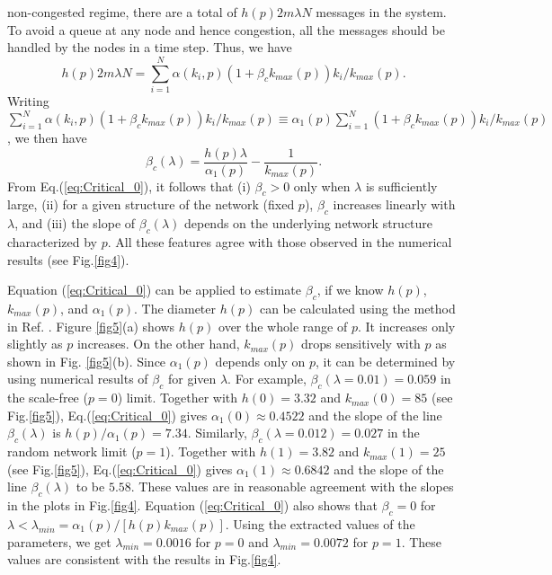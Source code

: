 \documentclass[aps,prl,twocolumn,superscriptaddress,showpacs]{revtex4}
\begin{document}
non-congested regime, there are a total of $h(p)2m\lambda N$
messages in the system. To avoid a queue at any node and hence
congestion, all the messages should be handled by the nodes in a
time step.  Thus, we have
\begin{equation} \label{eq:Little}
h(p)2m\lambda
N=\sum_{i=1}^N\alpha(k_i,p)(1+\beta_ck_{max}(p))k_i/k_{max}(p).
\end{equation}
Writing
$\sum_{i=1}^N\alpha(k_i,p)(1+\beta_ck_{max}(p))k_i/k_{max}(p)\equiv
\alpha_1(p)\sum_{i=1}^N(1+\beta_ck_{max}(p))k_i/k_{max}(p)$, we
then have
\begin{equation} \label{eq:Critical_0}
\beta_c(\lambda)
=\frac{h(p)\lambda}{\alpha_1(p)}-\frac{1}{k_{max}(p)}.
\end{equation}
From Eq.(\ref{eq:Critical_0}), it follows that (i) $\beta_{c} > 0$
only when $\lambda$ is sufficiently large, (ii) for a given
structure of the network (fixed $p$), $\beta_{c}$ increases
linearly with $\lambda$, and (iii) the slope of
$\beta_{c}(\lambda)$ depends on the underlying network structure
characterized by $p$.  All these features agree with those
observed in the numerical results (see Fig.\ref{fig4}).

Equation (\ref{eq:Critical_0}) can be applied to estimate
$\beta_{c}$, if we know $h(p)$, $k_{max}(p)$, and $\alpha_1(p)$.
The diameter $h(p)$ can be calculated using the method in Ref.
\cite{LL:2002}. Figure \ref{fig5}(a) shows $h(p)$ over the whole
range of $p$.  It increases only slightly as $p$ increases.  On
the other hand, $k_{max}(p)$ drops sensitively with $p$ as shown
in Fig. \ref{fig5}(b).  Since $\alpha_1(p)$ depends only on $p$,
it can be determined by using numerical results of $\beta_{c}$ for
given $\lambda$.  For example, $\beta_{c}(\lambda=0.01) = 0.059$
in the scale-free ($p=0$) limit.  Together with $h(0)=3.32$ and
$k_{max}(0)=85$ (see Fig.\ref{fig5}), Eq.(\ref{eq:Critical_0})
gives $\alpha_1(0)\approx 0.4522$ and the slope of the line
$\beta_{c}(\lambda)$ is $h(p)/\alpha_1(p) = 7.34$.  Similarly,
$\beta_{c}(\lambda = 0.012) = 0.027$ in the random network limit
($p=1$).  Together with $h(1)=3.82$ and $k_{max}(1)=25$ (see
Fig.\ref{fig5}), Eq.(\ref{eq:Critical_0}) gives
$\alpha_1(1)\approx 0.6842$ and the slope of the line
$\beta_{c}(\lambda)$ to be $5.58$.  These values are in reasonable
agreement with the slopes in the plots in Fig.\ref{fig4}. Equation
(\ref{eq:Critical_0}) also shows that $\beta_{c} = 0$ for $\lambda
< \lambda_{min} = \alpha_1(p)/[h(p)k_{max}(p)]$.  Using the
extracted values of the parameters, we get $\lambda_{min} =
0.0016$ for $p=0$ and $\lambda_{min} = 0.0072$ for $p=1$. These
values are consistent with the results in Fig.\ref{fig4}.
\end{document}

